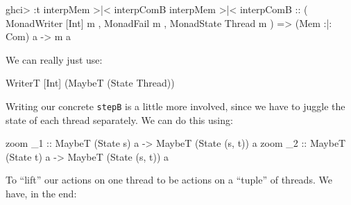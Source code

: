 \documentclass[]{article}
\newenvironment{Shaded}{}{}
\newcommand{\DataTypeTok}[1]{\textcolor[rgb]{0.56,0.13,0.00}{#1}}
\newcommand{\FunctionTok}[1]{\textcolor[rgb]{0.02,0.16,0.49}{#1}}
\newcommand{\NormalTok}[1]{#1}
\newcommand{\OtherTok}[1]{\textcolor[rgb]{0.00,0.44,0.13}{#1}}
\begin{document}
\begin{Shaded}
\begin{Highlighting}[]
\NormalTok{ghci}\FunctionTok{>} \FunctionTok{:}\NormalTok{t interpMem }\FunctionTok{>|<}\NormalTok{ interpComB}
\NormalTok{interpMem }\FunctionTok{>|<}\NormalTok{ interpComB}
\OtherTok{    ::}\NormalTok{ ( }\DataTypeTok{MonadWriter}\NormalTok{ [}\DataTypeTok{Int}\NormalTok{] m}
\NormalTok{       , }\DataTypeTok{MonadFail}\NormalTok{ m}
\NormalTok{       , }\DataTypeTok{MonadState} \DataTypeTok{Thread}\NormalTok{ m}
\NormalTok{       )}
    \OtherTok{=>}\NormalTok{ (}\DataTypeTok{Mem} \FunctionTok{:|:} \DataTypeTok{Com}\NormalTok{) a}
    \OtherTok{->}\NormalTok{ m a}
\end{Highlighting}
\end{Shaded}

We can really just use:

\begin{Shaded}
\begin{Highlighting}[]
\DataTypeTok{WriterT}\NormalTok{ [}\DataTypeTok{Int}\NormalTok{] (}\DataTypeTok{MaybeT}\NormalTok{ (}\DataTypeTok{State} \DataTypeTok{Thread}\NormalTok{))}
\end{Highlighting}
\end{Shaded}

Writing our concrete \texttt{stepB} is a little more involved, since we have to
juggle the state of each thread separately. We can do this using:

\begin{Shaded}
\begin{Highlighting}[]
\NormalTok{zoom}\OtherTok{ _1 ::} \DataTypeTok{MaybeT}\NormalTok{ (}\DataTypeTok{State}\NormalTok{ s) a }\OtherTok{->} \DataTypeTok{MaybeT}\NormalTok{ (}\DataTypeTok{State}\NormalTok{ (s, t)) a}
\NormalTok{zoom}\OtherTok{ _2 ::} \DataTypeTok{MaybeT}\NormalTok{ (}\DataTypeTok{State}\NormalTok{ t) a }\OtherTok{->} \DataTypeTok{MaybeT}\NormalTok{ (}\DataTypeTok{State}\NormalTok{ (s, t)) a}
\end{Highlighting}
\end{Shaded}

To ``lift'' our actions on one thread to be actions on a ``tuple'' of threads.
We have, in the end:
\end{document}
